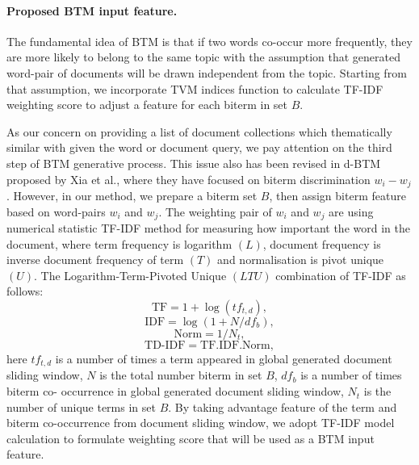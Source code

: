 \paragraph{Proposed BTM input feature.} The fundamental idea of BTM is that if two words co-occur more frequently, they are more likely to belong to the same topic \cite{ChengYanLan} with the assumption that generated word-pair of documents will be drawn independent from the topic. Starting from that assumption, we incorporate TVM indices function to calculate TF-IDF weighting score to adjust a feature for each biterm in set \(B\).

As our concern on providing a list of document collections which thematically similar with given the word or document query, we pay attention on the third step of BTM generative process. This issue also has been revised in d-BTM \cite{XiaTangHussain} proposed by Xia et al., where they have focused on biterm discrimination \(w_i - w_j\). However, in our method, we prepare a biterm set \(B\), then assign biterm feature based on word-pairs \(w_i\) and \(w_j\). The weighting pair of \(w_i\) and \(w_j\) are using numerical statistic TF-IDF method \cite{ManningRaghavanSchutze,ZhangYoshidaTang} for measuring how important the word in the document, where term frequency is logarithm \((L)\), document frequency is inverse document frequency of term \((T)\) and normalisation is pivot unique \((U)\). The Logarithm-Term-Pivoted Unique \((LTU)\) combination of TF-IDF as follows:
\begin{equation}
	\label{eqn:25}
	\text{TF} = 1 + \log{(tf_{t, d})},
\end{equation}
\begin{equation}
	\label{eqn:26}
	\text{IDF} = \log{(1 + N / df_b)},
\end{equation}
\begin{equation}
	\label{eqn:27}
	\text{Norm} = 1 / N_t,
\end{equation}
\begin{equation}
	\label{eqn:28}
	\text{TD-IDF} = \text{TF}.\text{IDF}.\text{Norm},
\end{equation}
here \(tf_{t,d}\) is a number of times a term appeared in global generated document sliding window, \(N\) is the total number biterm in set \(B\), \(df_b\) is a number of times biterm co- occurrence in global generated document sliding window, \(N_t\) is the number of unique terms in set \(B\). By taking advantage feature of the term and biterm co-occurrence from document sliding window, we adopt TF-IDF model calculation to formulate weighting score that will be used as a BTM input feature.

